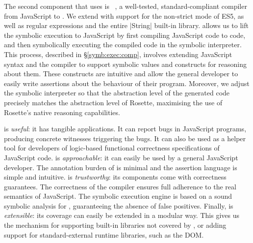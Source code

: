 The second component that \jilette uses is \JSComp~\cite{javert}, 
a well-tested, standard-compliant compiler from JavaScript to \jsil. We extend
\JSComp with support for the non-strict mode of ES5, as well as
regular expressions and the entire \jsinline|String| built-in library.
\JSComp allows us to lift the \jsil symbolic execution to JavaScript by first compiling JavaScript code to \jsil code, and
then symbolically executing the compiled code in the 
\jsil symbolic interpreter. This process, described in \S\ref{symb:exec:comp},
involves extending JavaScript syntax and the \JSComp compiler to support symbolic values and 
constructs for reasoning about them. These constructs are intuitive
and allow the general developer to easily write assertions about the behaviour
of their program. 
Moreover, we adjust the \jsil symbolic interpreter so that the abstraction level 
of the generated \jsil code precisely matches the abstraction level of Rosette, 
 maximising the use of Rosette's native reasoning capabilities.


\jilette is \emph{useful}: it has tangible applications. 
It can report bugs in JavaScript programs, producing concrete witnesses triggering the bugs. It can also be used as a helper tool for developers of logic-based functional correctness specifications of JavaScript code.
\jilette is \emph{approachable}: it can easily be used by a general JavaScript developer. The annotation burden of \jilette is minimal and the assertion language is simple and intuitive. 
\jilette is \emph{trustworthy}: its components come with correctness guarantees. 
The correctness of the \JSComp compiler ensures full adherence to the real semantics of JavaScript. The \jilette symbolic execution engine is based on a sound symbolic
analysis for \jsil, guaranteeing the absence of false positives. 
Finally, \jilette is \emph{extensible}: its coverage can easily be extended in a modular way. This gives us the mechanism for supporting built-in libraries not covered by \JSComp, or adding support for standard-external runtime libraries, such as the DOM.